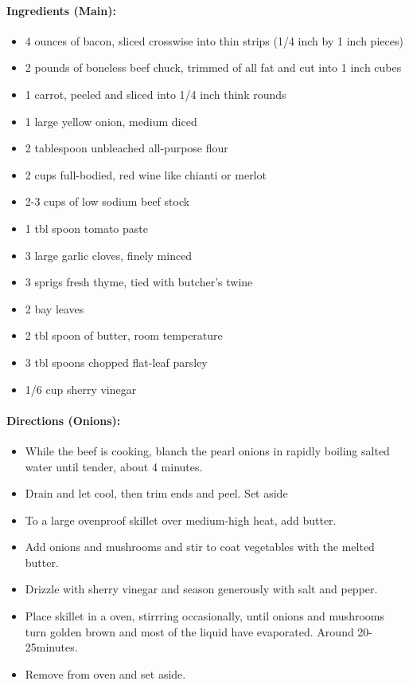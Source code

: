 \documentclass{article}
\begin{document}
\paragraph{Ingredients (Main):}
\begin{itemize}
    \item 4 ounces of bacon, sliced crosswise into thin strips (1/4 inch by 1 inch pieces)
    \item 2 pounds of boneless beef chuck, trimmed of all fat and cut into 1 inch cubes
    \item 1 carrot, peeled and sliced into 1/4 inch think rounds
    \item 1 large yellow onion, medium diced
    \item 2 tablespoon unbleached all-purpose flour
    \item 2 cups full-bodied, red wine like chianti or merlot
    \item 2-3 cups of low sodium beef stock
    \item 1 tbl spoon tomato paste
    \item 3 large garlic cloves, finely minced
    \item 3 sprigs fresh thyme, tied with butcher's twine
    \item 2 bay leaves
    \item 2 tbl spoon of butter, room temperature
    \item 3 tbl spoons chopped flat-leaf parsley
    \item 1/6 cup sherry vinegar
\end{itemize}  

\paragraph{Directions (Onions):}
\begin{itemize}
    \item While the beef is cooking, blanch the pearl onions in rapidly boiling salted water until tender, about 4 minutes.
    \item Drain and let cool, then trim ends and peel. Set aside
    \item To a large ovenproof skillet over medium-high heat, add butter.
    \item Add onions and mushrooms and stir to coat vegetables with the melted butter.
    \item Drizzle with sherry vinegar and season generously with salt and pepper.
    \item Place skillet in a oven, stirrring occasionally, until onions and mushrooms turn golden brown and most of the liquid have evaporated. Around 20-25minutes.
    \item Remove from oven and set aside.
\end{itemize}  
\end{document}
